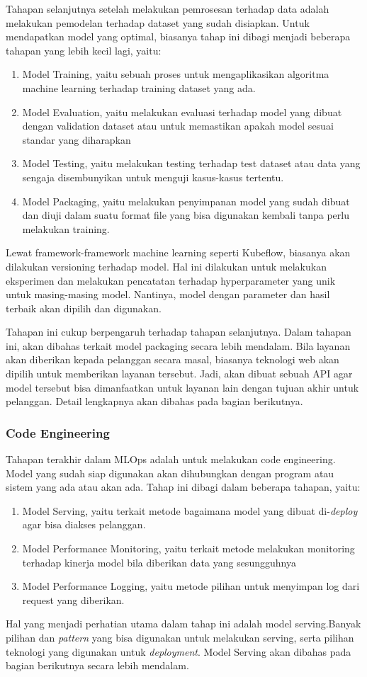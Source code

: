 Tahapan selanjutnya setelah melakukan pemrosesan terhadap data adalah melakukan pemodelan terhadap dataset yang sudah disiapkan.
Untuk mendapatkan model yang optimal, biasanya tahap ini dibagi menjadi beberapa tahapan yang lebih kecil lagi, yaitu:
\begin{enumerate}
  \item Model Training, yaitu sebuah proses untuk mengaplikasikan algoritma machine learning terhadap training dataset yang ada.
  \item Model Evaluation, yaitu melakukan evaluasi terhadap model yang dibuat dengan validation dataset atau untuk memastikan apakah model sesuai standar yang diharapkan
  \item Model Testing, yaitu melakukan testing terhadap test dataset atau data yang sengaja disembunyikan untuk menguji kasus-kasus tertentu.
  \item Model Packaging, yaitu melakukan penyimpanan model yang sudah dibuat dan diuji dalam suatu format file yang bisa digunakan kembali tanpa perlu melakukan training.
\end{enumerate}

Lewat framework-framework machine learning seperti Kubeflow, biasanya akan dilakukan versioning terhadap model.
Hal ini dilakukan untuk melakukan eksperimen dan melakukan pencatatan terhadap hyperparameter yang unik untuk masing-masing model.
Nantinya, model dengan parameter dan hasil terbaik akan dipilih dan digunakan.

Tahapan ini cukup berpengaruh terhadap tahapan selanjutnya.
Dalam tahapan ini, akan dibahas terkait model packaging secara lebih mendalam.
Bila layanan akan diberikan kepada pelanggan secara masal, biasanya teknologi web akan dipilih untuk memberikan layanan tersebut.
Jadi, akan dibuat sebuah API agar model tersebut bisa dimanfaatkan untuk layanan lain dengan tujuan akhir untuk pelanggan. Detail lengkapnya akan dibahas pada bagian berikutnya. 

\subsubsection{Code Engineering}

Tahapan terakhir dalam MLOps adalah untuk melakukan code engineering.
Model yang sudah siap digunakan akan dihubungkan dengan program atau sistem yang ada atau akan ada.
Tahap ini dibagi dalam beberapa tahapan, yaitu:

\begin{enumerate}
  \item Model Serving, yaitu terkait metode bagaimana model yang dibuat di-\textit{deploy} agar bisa diakses pelanggan.
  \item Model Performance Monitoring, yaitu terkait metode melakukan monitoring terhadap kinerja model bila diberikan data yang sesungguhnya
  \item Model Performance Logging, yaitu metode pilihan untuk menyimpan log dari request yang diberikan.
\end{enumerate}

Hal yang menjadi perhatian utama dalam tahap ini adalah model serving.Banyak pilihan dan \textit{pattern} yang bisa digunakan untuk melakukan serving, serta pilihan teknologi yang digunakan untuk \textit{deployment}.
Model Serving akan dibahas pada bagian berikutnya secara lebih mendalam.